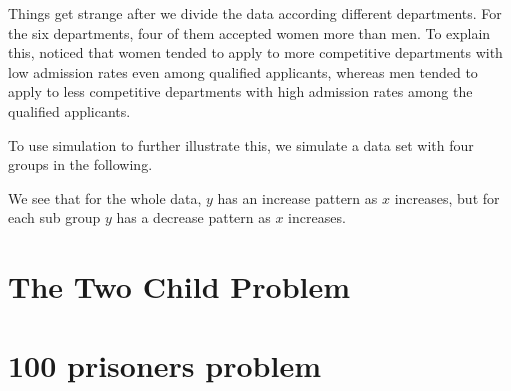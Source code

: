 Things get strange after we divide the data according different departments. For the six departments, four of them accepted women more than men. 
To explain this, \cite{bickel1975sex} noticed that women tended to apply to more competitive departments with low admission rates even among qualified applicants, whereas men tended to apply to less competitive departments with high admission rates among the qualified applicants.

To use simulation to further illustrate this, we simulate a data set with four groups in the following.

We see that for the whole data, $y$ has an increase pattern as $x$ increases, but for each sub group $y$ has a decrease pattern as $x$ increases. 

\hypertarget{the-two-child-problem}{%
\section{The Two Child Problem}\label{the-two-child-problem}}

\hypertarget{prisoners-problem}{%
\section{100 prisoners problem}\label{prisoners-problem}}


